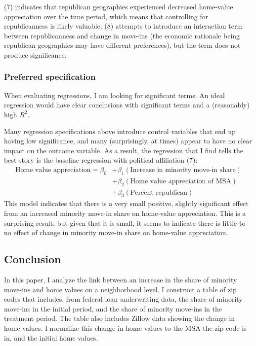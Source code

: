 \documentclass[11pt]{article}
\begin{document}
    (7) indicates that republican geographies experienced decreased home-value appreciation over the time period, which means that controlling for republicanness is likely valuable. (8) attempts to introduce an interaction term between republicanness and change in move-ins (the economic rationale being republican geographies may have different preferences), but the term does not produce significance.

    \subsubsection{Preferred specification}\label{preferred-specification}

    When evaluating regressions, I am looking for significant terms. An
ideal regression would have clear conclusions with significant terms and
a (reasonably) high \(R^2\).

Many regression specifications above introduce control variables that
end up having low significance, and many (surprisingly, at times) appear
to have no clear impact on the outcome variable. As a result, the
regression that I find tells the best story is the baseline regression with political affiliation (7):
\begin{align*}
    \text{Home value appreciation}=\beta_0&+\beta_1(\text{Increase in minority move-in share})\\
    &+\beta_2(\text{Home value appreciation of MSA})\\
    &+\beta_3(\text{Percent republican})
\end{align*}
This model indicates that there is a very small positive, slightly significant
effect from an increased minority move-in share on home-value
appreciation. This is a surprising result, but given that it is small,
it seems to indicate there is little-to-no effect of change in minority
move-in share on home-value appreciation.

    \subsection{Conclusion}\label{conclusion}

    In this paper, I analyze the link between an increase in the share of
minority move-ins and home values on a neighborhood level. I construct a
table of zip codes that includes, from federal loan underwriting data,
the share of minority move-ins in the initial period, and the share of
minority move-ins in the treatment period. The table also includes
Zillow data showing the change in home values. I normalize this change
in home values to the MSA the zip code is in, and the initial home
values.
\end{document}
